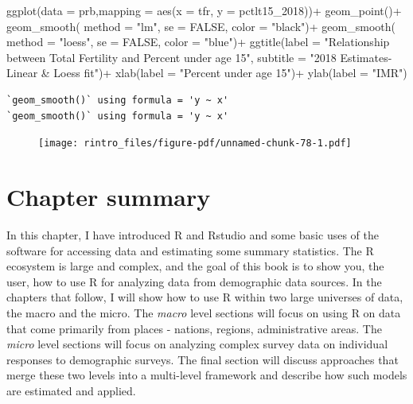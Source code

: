 \documentclass[
  letterpaper,
  DIV=11,
  numbers=noendperiod]{scrreprt}
\newenvironment{Shaded}{\begin{snugshade}}{\end{snugshade}}
\newcommand{\AttributeTok}[1]{\textcolor[rgb]{0.40,0.45,0.13}{#1}}
\newcommand{\ConstantTok}[1]{\textcolor[rgb]{0.56,0.35,0.01}{#1}}
\newcommand{\FunctionTok}[1]{\textcolor[rgb]{0.28,0.35,0.67}{#1}}
\newcommand{\NormalTok}[1]{\textcolor[rgb]{0.00,0.23,0.31}{#1}}
\newcommand{\SpecialCharTok}[1]{\textcolor[rgb]{0.37,0.37,0.37}{#1}}
\newcommand{\StringTok}[1]{\textcolor[rgb]{0.13,0.47,0.30}{#1}}
\begin{document}
\begin{Shaded}
\begin{Highlighting}[]
\FunctionTok{ggplot}\NormalTok{(}\AttributeTok{data =}\NormalTok{ prb,}\AttributeTok{mapping =} \FunctionTok{aes}\NormalTok{(}\AttributeTok{x =}\NormalTok{ tfr, }\AttributeTok{y =}\NormalTok{ pctlt15\_2018))}\SpecialCharTok{+}
  \FunctionTok{geom\_point}\NormalTok{()}\SpecialCharTok{+}
  \FunctionTok{geom\_smooth}\NormalTok{( }\AttributeTok{method =} \StringTok{"lm"}\NormalTok{,}
               \AttributeTok{se =} \ConstantTok{FALSE}\NormalTok{,}
               \AttributeTok{color =} \StringTok{"black"}\NormalTok{)}\SpecialCharTok{+}
  \FunctionTok{geom\_smooth}\NormalTok{( }\AttributeTok{method =} \StringTok{"loess"}\NormalTok{,}
               \AttributeTok{se =} \ConstantTok{FALSE}\NormalTok{,}
               \AttributeTok{color =} \StringTok{"blue"}\NormalTok{)}\SpecialCharTok{+}
  \FunctionTok{ggtitle}\NormalTok{(}\AttributeTok{label =} \StringTok{"Relationship between Total Fertility and Percent under age 15"}\NormalTok{,}
          \AttributeTok{subtitle =} \StringTok{"2018 Estimates{-} Linear \& Loess fit"}\NormalTok{)}\SpecialCharTok{+}
  \FunctionTok{xlab}\NormalTok{(}\AttributeTok{label =} \StringTok{"Percent under age 15"}\NormalTok{)}\SpecialCharTok{+}
  \FunctionTok{ylab}\NormalTok{(}\AttributeTok{label =} \StringTok{"IMR"}\NormalTok{)}
\end{Highlighting}
\end{Shaded}

\begin{verbatim}
`geom_smooth()` using formula = 'y ~ x'
`geom_smooth()` using formula = 'y ~ x'
\end{verbatim}

\begin{figure}[H]

{\centering \texttt{[image: rintro\_files/figure-pdf/unnamed-chunk-78-1.pdf]}

}

\end{figure}

\hypertarget{chapter-summary}{%
\section{Chapter summary}\label{chapter-summary}}

In this chapter, I have introduced R and Rstudio and some basic uses of
the software for accessing data and estimating some summary statistics.
The R ecosystem is large and complex, and the goal of this book is to
show you, the user, how to use R for analyzing data from demographic
data sources. In the chapters that follow, I will show how to use R
within two large universes of data, the macro and the micro. The
\emph{macro} level sections will focus on using R on data that come
primarily from places - nations, regions, administrative areas. The
\emph{micro} level sections will focus on analyzing complex survey data
on individual responses to demographic surveys. The final section will
discuss approaches that merge these two levels into a multi-level
framework and describe how such models are estimated and applied.
\end{document}
